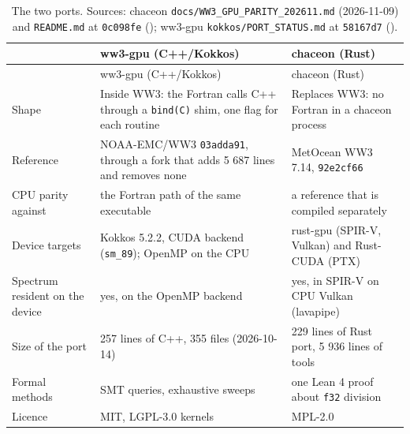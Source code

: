 \documentclass[10pt,a4paper,]{article}
\begin{document}
\begin{longtable}[]{@{}
  >{\raggedright\arraybackslash}p{}
  >{\raggedright\arraybackslash}p{}
  >{\raggedright\arraybackslash}p{}@{}}
\caption{\label{tbl:shapes}The two ports. Sources: chaceon
\texttt{docs/WW3\_GPU\_PARITY\_202611.md} (2026-11-09) and
\texttt{README.md} at \texttt{0c098fe} (); ww3-gpu \texttt{kokkos/PORT\_STATUS.md} at \texttt{58167d7}
().}\tabularnewline
\toprule\noalign{}
\begin{minipage}[b]{\linewidth}\raggedright
\end{minipage} & \begin{minipage}[b]{\linewidth}\raggedright
ww3-gpu (C++/Kokkos)
\end{minipage} & \begin{minipage}[b]{\linewidth}\raggedright
chaceon (Rust)
\end{minipage} \\
\midrule\noalign{}
\endfirsthead
\toprule\noalign{}
\begin{minipage}[b]{\linewidth}\raggedright
\end{minipage} & \begin{minipage}[b]{\linewidth}\raggedright
ww3-gpu (C++/Kokkos)
\end{minipage} & \begin{minipage}[b]{\linewidth}\raggedright
chaceon (Rust)
\end{minipage} \\
\midrule\noalign{}
\endhead
\bottomrule\noalign{}
\endlastfoot
Shape & Inside WW3: the Fortran calls C++ through a \texttt{bind(C)}
shim, one flag for each routine & Replaces WW3: no Fortran in a chaceon
process \\
Reference & NOAA-EMC/WW3 \texttt{03adda91}, through a fork that adds 5
687 lines and removes none & MetOcean WW3 7.14, \texttt{92e2cf66} \\
CPU parity against & the Fortran path of the same executable & a
reference that is compiled separately \\
Device targets & Kokkos 5.2.2, CUDA backend (\texttt{sm\_89}); OpenMP on
the CPU & rust-gpu (SPIR-V, Vulkan) and Rust-CUDA (PTX) \\
Spectrum resident on the device & yes, on the OpenMP backend & yes, in
SPIR-V on CPU Vulkan (lavapipe) \\
Size of the port & 62 257 lines of C++, 355 files (2026-10-14) & 29 229
lines of Rust port, 5 936 lines of tools \\
Formal methods & SMT queries, exhaustive sweeps & one Lean 4 proof about
\texttt{f32} division \\
Licence & MIT, LGPL-3.0 kernels & MPL-2.0 \\
\end{longtable}
\end{document}
